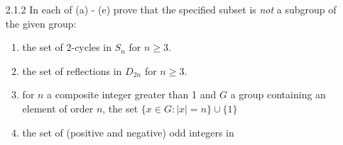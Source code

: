 \begin{enumerate}
      \begin{enumerate}
         \item Let $S = \{a + ai: a \in \R, i^2 = -1\}$. The set $S$ is clearly
               nonempty, so let $x+xi, y+yi \in S$. We then have that
               $(x+xi)-(y+yi) = (x-y) + (x-y)i \in S$, so that $S \le \C$.
         \item Let $S = \{a \in \C: |a| = 1\}$. The set $S$ is clearly nonempty,
               so let $x, y \in S$. We then have that
               $|xy| = |x||y| = 1 \cdot 1 = 1$, so that $xy \in S$. Write
               $x = r + si$, so that $x^{-1} = r - si$. Since
               $|x| = r^2 + s^2 = |x^{-1}| = 1$, we have that $x^{-1} \in S$.
               Hence $S$ is closed under inverses and multiplication and we have
               that $S \le \C$.
         \item Let $n$ be a positive integer and \
               $S = \left\{\D\frac{a}{b} \in \Q: b \mid n\right\}$. The set $S$
               is nonempty since it contains 0. Let $\D\frac{a}{b}$,
               $\D\frac{c}{d} \in S$. Let $l = \mbox{lcm}(b, d)$. By membership
               in $S$, we have that $b \mid n$ and $d \mid n$. Thus $l \mid n$.
               So there exists an integer $m$ such that 
               $\D\frac{a}{b} - \frac{c}{d} = \frac{m}{l}$. Let
               $\D\frac{m'}{l'} = \frac{m}{l}$ such that $\gcd(m', l') = 1$.
               Then $l' \mid l$; since $l \mid n$, it follows that $l' \mid n$,
               so that
               $\D\frac{a}{b} - \frac{c}{d} = \frac{m}{l} =\frac{m'}{l'} \in S$.
               Thus $S$ is an additive group. \qed
      \end{enumerate}
   \item[2.1.2]   In each of (a) - (e) prove that the specified subset is
                  \textit{not} a subgroup of the given group:
                  \begin{enumerate}
                     \item the set of 2-cycles in $S_n$ for $n \ge 3$.
                     \item the set of reflections in $D_{2n}$ for $n \ge 3$.
                     \item for $n$ a composite integer greater than 1 and $G$ a
                           group containing an element of order $n$, the set
                           $\{x \in G : |x| = n\} \cup \{1\}$
                     \item the set of (positive and negative) odd integers in

\end{enumerate}
\end{enumerate}
